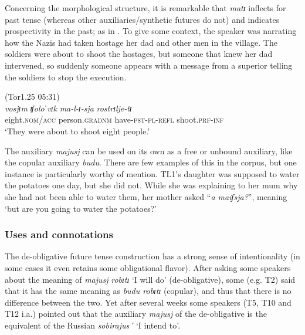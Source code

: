 \documentclass[output=paper,colorlinks,citecolor=brown]{langscibook}
\begin{document}
\largerpage[1]

Concerning the morphological structure, it is remarkable that \textit{matɪ} inflects for past tense (whereas other auxiliaries/synthetic futures do not) and indicates prospectivity in the past; as in . To give some context, the speaker was narrating how the Nazis had taken hostage her dad and other men in the village. The soldiers were about to shoot the hostages, but someone that knew her dad intervened, so suddenly someone appears with a message from a superior telling the soldiers to stop the execution.

\ea \label{ex:roncero:8}
     (Tor1.25 05:31)\\
     \gll \textit{vosjɪm} \textit{ʧoloˈvɪk} \textit{ma-l-ɪ-sja} \textit{rostrɪlje-tɪ}\\
     eight.\textsc{nom/acc} person.\textsc{gradnm} have-\textsc{pst-pl-refl} shoot.\textsc{prf-inf}\\
     \glt ‘They were about to shoot eight people.’  
 \z

The auxiliary \textit{majusj} can be used on its own as a free or unbound auxiliary, like the copular auxiliary \textit{budu}. There are few examples of this in the corpus, but one instance is particularly worthy of mention. TL1’s daughter was supposed to water the potatoes one day, but she did not. While she was explaining to her mum why she had not been able to water them, her mother asked “\textit{a maiʃsja?}”, meaning ‘but are you going to water the potatoes?’


\subsubsection{Uses and connotations} \label{sec:roncero:2.1.2}

The de-obligative future tense construction has a strong sense of intentionality (in some cases it even retains some obligational flavor). After asking some speakers about the meaning of \textit{majusj} \textit{robɪtɪ} ‘I will do’ (de-obligative), some (e.g. T2) said that it has the same meaning as \textit{budu robɪtɪ} (copular), and thus that there is no difference between the two. Yet after several weeks some speakers (T5, T10 and T12 i.a.) pointed out that the auxiliary \textit{majusj} of the de-obligative is the equivalent of the Russian \textit{sobirajus´} ‘I intend to’.

\largerpage[1]
\end{document}
